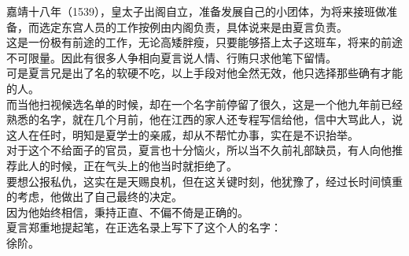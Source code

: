 \begin{multicols}{\theparacolNo}
嘉靖十八年（1539），皇太子出阁自立，准备发展自己的小团体，为将来接班做准备，而选定东宫人员的工作按例由内阁负责，具体说来是由夏言负责。\\

这是一份极有前途的工作，无论高矮胖瘦，只要能够搭上太子这班车，将来的前途不可限量。因此有很多人争相向夏言说人情、行贿只求他笔下留情。\\

可是夏言兄是出了名的软硬不吃，以上手段对他全然无效，他只选择那些确有才能的人。\\

而当他扫视候选名单的时候，却在一个名字前停留了很久，这是一个他九年前已经熟悉的名字，就在几个月前，他在江西的家人还专程写信给他，信中大骂此人，说这人在任时，明知是夏学士的亲戚，却从不帮忙办事，实在是不识抬举。\\

对于这个不给面子的官员，夏言也十分恼火，所以当不久前礼部缺员，有人向他推荐此人的时候，正在气头上的他当时就拒绝了。\\

要想公报私仇，这实在是天赐良机，但在这关键时刻，他犹豫了，经过长时间慎重的考虑，他做出了自己最终的决定。\\

因为他始终相信，秉持正直、不偏不倚是正确的。\\

夏言郑重地提起笔，在正选名录上写下了这个人的名字：\\

徐阶。\\
\ifnum{}
	\end{multicols}
\fi
\newpage
